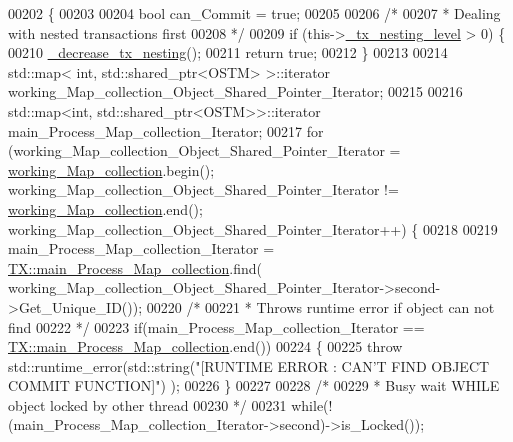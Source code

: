 \begin{DoxyCode}
00202                 \{
00203 
00204     \textcolor{keywordtype}{bool} can\_Commit = \textcolor{keyword}{true};
00205  
00206     \textcolor{comment}{/*}
00207 \textcolor{comment}{     * Dealing with nested transactions first 
}
00208 \textcolor{comment}{     */}
00209     \textcolor{keywordflow}{if} (this->\hyperlink{class_t_x_ae8f413fd7f4fea322e7ad3c668f9898e_ae8f413fd7f4fea322e7ad3c668f9898e}{\_tx\_nesting\_level} > 0) \{
00210         \hyperlink{class_t_x_aa3ac499f576326588628ade96b27b4b1_aa3ac499f576326588628ade96b27b4b1}{\_decrease\_tx\_nesting}();
00211         \textcolor{keywordflow}{return} \textcolor{keyword}{true};
00212     \} 
00213     
00214     std::map< int, std::shared\_ptr<OSTM> >::iterator working\_Map\_collection\_Object\_Shared\_Pointer\_Iterator;
00215 
00216     std::map<int, std::shared\_ptr<OSTM>>::iterator main\_Process\_Map\_collection\_Iterator;
00217     \textcolor{keywordflow}{for} (working\_Map\_collection\_Object\_Shared\_Pointer\_Iterator = 
      \hyperlink{class_t_x_a81aafda16e2f20e36ec6c68e584668ff_a81aafda16e2f20e36ec6c68e584668ff}{working\_Map\_collection}.begin(); working\_Map\_collection\_Object\_Shared\_Pointer\_Iterator
       != \hyperlink{class_t_x_a81aafda16e2f20e36ec6c68e584668ff_a81aafda16e2f20e36ec6c68e584668ff}{working\_Map\_collection}.end(); 
      working\_Map\_collection\_Object\_Shared\_Pointer\_Iterator++) \{
00218 
00219             main\_Process\_Map\_collection\_Iterator = 
      \hyperlink{class_t_x_a1a45d726894190695314464d7cd97c29_a1a45d726894190695314464d7cd97c29}{TX::main\_Process\_Map\_collection}.find(
      working\_Map\_collection\_Object\_Shared\_Pointer\_Iterator->second->Get\_Unique\_ID());
00220             \textcolor{comment}{/*}
00221 \textcolor{comment}{             * Throws runtime error if object can not find
}
00222 \textcolor{comment}{             */}
00223             \textcolor{keywordflow}{if}(main\_Process\_Map\_collection\_Iterator == 
      \hyperlink{class_t_x_a1a45d726894190695314464d7cd97c29_a1a45d726894190695314464d7cd97c29}{TX::main\_Process\_Map\_collection}.end())
00224             \{
00225                 \textcolor{keywordflow}{throw} std::runtime\_error(std::string(\textcolor{stringliteral}{"[RUNTIME ERROR : CAN'T FIND OBJECT COMMIT FUNCTION]"})
      );
00226             \}
00227 
00228         \textcolor{comment}{/*}
00229 \textcolor{comment}{         * Busy wait WHILE object locked by other thread
}
00230 \textcolor{comment}{         */}
00231         \textcolor{keywordflow}{while}(!(main\_Process\_Map\_collection\_Iterator->second)->is\_Locked());

\end{DoxyCode}
